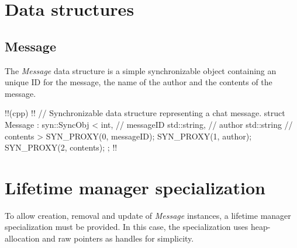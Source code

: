 \documentclass{report}
\begin{document}
        \section{Data structures}

            \subsection{Message}

                The \emph{Message} data structure is a simple synchronizable object containing an unique ID for the message, the name of the author and the contents of the message.

            !!(cpp)
            !!{
    // Synchronizable data structure representing a chat message.
    struct Message : syn::SyncObj
    <
        int,            // messageID
        std::string,    // author
        std::string     // contents
    >
    {
        SYN_PROXY(0, messageID);
        SYN_PROXY(1, author);
        SYN_PROXY(2, contents);
    };
            !!}                

        \section{Lifetime manager specialization}

            To allow creation, removal and update of \emph{Message} instances, a lifetime manager specialization must be provided.
            In this case, the specialization uses heap-allocation and raw pointers as handles for simplicity.
\end{document}
